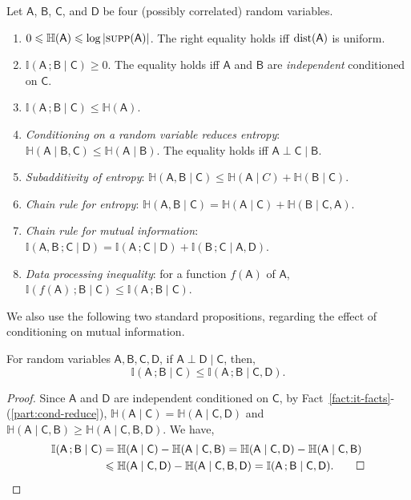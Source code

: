 \documentclass[11pt,letterpaper]{article}
\renewcommand{\geq}{\geqslant}
\renewcommand{\leq}{\leqslant}
\renewcommand{\ge}{\geq}
\theoremstyle{definition}
\newcommand{\supp}[1]{\ensuremath{\textsc{supp}(#1)}}
\newcommand{\rA}{\rv{A}}
\newcommand{\rB}{\rv{B}}
\newcommand{\rC}{\rv{C}}
\newcommand{\rD}{\rv{D}}
\newcommand{\rv}[1]{\ensuremath{\mathsf{#1}}}
\newcommand{\II}{\ensuremath{\mathbb{I}}}
\newcommand{\HH}{\ensuremath{\mathbb{H}}}
\newcommand{\mi}[2]{\ensuremath{\II(#1 \,; #2)}}
\newcommand{\en}[1]{\ensuremath{\HH(#1)}}
\newcommand{\itfacts}[1]{Fact~\ref{fact:it-facts}-(\ref{part:#1})\xspace}
\newcommand{\distribution}[1]{\ensuremath{\textnormal{dist}(#1)}\xspace}
\begin{document}
\begin{fact}\label{fact:it-facts}
  Let $\rA$, $\rB$, $\rC$, and $\rD$ be four (possibly correlated) random variables.
   \begin{enumerate}
  \item \label{part:uniform} $0 \leq \en{\rA} \leq \log|\supp{\rA}|$. The right equality holds
    iff $\distribution{\rA}$ is uniform.
  \item \label{part:info-zero} $\mi{\rA}{\rB \mid \rC} \geq 0$. The equality holds iff $\rA$ and
    $\rB$ are \emph{independent} conditioned on $\rC$.
    \item \label{part:info-atmost-rv} $\mi{\rA}{\rB \mid \rC} \leq \en{\rA}$.
  \item \label{part:cond-reduce} \emph{Conditioning on a random variable reduces entropy}:
    $\en{\rA \mid \rB,\rC} \leq \en{\rA \mid  \rB}$.  The equality holds iff $\rA \perp \rC \mid \rB$.
    \item \label{part:sub-additivity} \emph{Subadditivity of entropy}: $\en{\rA,\rB \mid \rC}
    \leq \en{\rA \mid C} + \en{\rB \mid  \rC}$.
   \item \label{part:ent-chain-rule} \emph{Chain rule for entropy}: $\en{\rA,\rB \mid \rC} = \en{\rA \mid \rC} + \en{\rB \mid \rC,\rA}$.
  \item \label{part:chain-rule} \emph{Chain rule for mutual information}: $\mi{\rA,\rB}{\rC \mid \rD} = \mi{\rA}{\rC \mid \rD} + \mi{\rB}{\rC \mid  \rA,\rD}$.
  \item \label{part:data-processing} \emph{Data processing inequality}: for a function $f(\rA)$ of $\rA$, $\mi{f(\rA)}{\rB \mid \rC} \leq \mi{\rA}{\rB \mid \rC}$. 
   \end{enumerate}
\end{fact}


\noindent
We also use the following two standard propositions, regarding the effect of conditioning on mutual information.

\begin{proposition}\label{prop:info-increase}
  For random variables $\rA, \rB, \rC, \rD$, if $\rA \perp \rD \mid \rC$, then, 
  \[\mi{\rA}{\rB \mid \rC} \leq \mi{\rA}{\rB \mid  \rC,  \rD}.\]
\end{proposition}
 \begin{proof}
  Since $\rA$ and $\rD$ are independent conditioned on $\rC$, by
  \itfacts{cond-reduce}, $\HH(\rA \mid  \rC) = \HH(\rA \mid \rC, \rD)$ and $\HH(\rA \mid  \rC, \rB) \ge \HH(\rA \mid  \rC, \rB, \rD)$.  We have,
	 \begin{align*}
	  \mi{\rA}{\rB \mid  \rC} &= \HH(\rA \mid \rC) - \HH(\rA \mid \rC, \rB) = \HH(\rA \mid  \rC, \rD) - \HH(\rA \mid \rC, \rB) \\
	  &\leq \HH(\rA \mid \rC, \rD) - \HH(\rA \mid \rC, \rB, \rD) = \mi{\rA}{\rB \mid \rC, \rD}. \qed
	\end{align*}
	
\end{proof}
\end{document}
